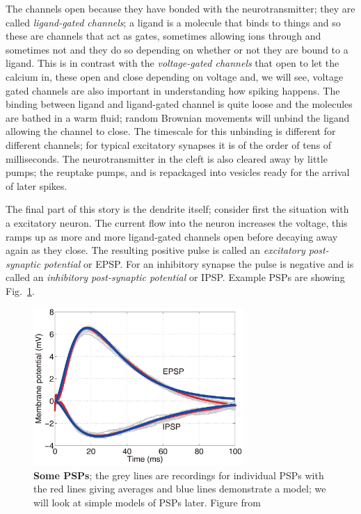 \documentclass[12pt]{article}
\begin{document}
The channels open because they have bonded with the neurotransmitter;
they are called \textsl{ligand-gated channels}; a ligand is a molecule
that binds to things and so these are channels that act as gates,
sometimes allowing ions through and sometimes not and they do so
depending on whether or not they are bound to a ligand. This is in
contrast with the \textsl{voltage-gated channels} that open to let the
calcium in, these open and close depending on voltage and, we will
see, voltage gated channels are also important in understanding how
spiking happens. The binding between ligand and ligand-gated channel
is quite loose and the molecules are bathed in a warm fluid; random
Brownian movements will unbind the ligand allowing the channel to
close. The timescale for this unbinding is different for different
channels; for typical excitatory synapses it is of the order of tens
of milliseconds. The neurotransmitter in the cleft is also cleared
away by little pumps; the reuptake pumps, and is repackaged into
vesicles ready for the arrival of later spikes.

The final part of this story is the dendrite itself; consider first
the situation with a excitatory neuron. The current flow into the
neuron increases the voltage, this ramps up as more and more
ligand-gated channels open before decaying away again as they
close. The resulting positive pulse is called an \textsl{excitatory
  post-synaptic potential} or EPSP. For an inhibitory synapse the
pulse is negative and is called an \textsl{inhibitory post-synaptic
  potential} or IPSP. Example PSPs are showing Fig.~\ref{fig_psp}.


\begin{figure}[tbhp]
  \begin{center}
    \includegraphics[width=8cm]{psp.jpg}
    \end{center}
  \caption{\textbf{Some PSPs}; the grey lines are recordings for
    individual PSPs with the red lines giving averages and blue lines
    demonstrate a model; we will look at simple models of PSPs
    later. Figure from \cite{ZhouEtAl2013}\label{fig_psp}}
\end{figure}
\end{document}

